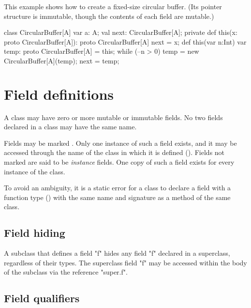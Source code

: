 \begin{example}
This example shows how to create a fixed-size circular buffer.
(Its pointer structure is immutable, though the contents of each
field are mutable.)
{\footnotesize

\begin{xten}
class  CircularBuffer[A] {
  var a: A;
  val next: CircularBuffer[A];
  private def this(x: proto CircularBuffer[A]): proto CircularBuffer[A] {
    next = x;
  }
  def this(var n:Int) {
    var temp: proto CircularBuffer[A] = this;
    while (--n > 0) 
      temp = new CircularBuffer[A](temp);
    next = temp;
  }
}
\end{xten}}
%

\end{example}
\section{Field definitions}

A class may have zero or more mutable or immutable fields. 
No two fields declared in a class may have the same name. 

Fields may be marked . Only one instance of such a field
exists, and it may be accessed through the name of the class in which
it is defined ().  Fields not marked
 are said to be {\em instance} fields. One copy of such a
field exists for every instance of the class.

To avoid an ambiguity, it is a static error for a class to
declare a field with a function type () with
the same name and signature  as a method of the same class.

\subsection{Field hiding}

A subclass that defines a field \xcd"f" hides any field \xcd"f"
declared in a superclass, regardless of their types.  The
superclass field \xcd"f" may be accessed within the body of
the subclass via the reference \xcd"super.f".

\subsection{Field qualifiers}
\label{FieldQualifier}

